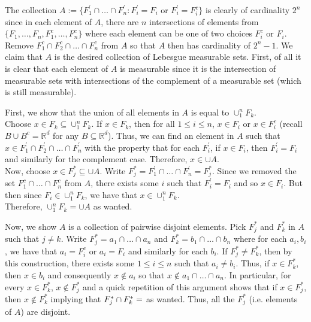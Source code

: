 \documentclass[12pt]{article}
\newcommand{\R}{\mathbb{R}}
\newenvironment{solution}[2][Solution]{\begin{trivlist}
\item[\hskip \labelsep {\bfseries #1}]}{\end{trivlist}}
\begin{document}
\begin{solution}{}

    The collection $A:= \{F_1^{'} \cap \hdots \cap F_n^{'}: F_i^{'} = F_i$ or $F_i^{'} = F_i^c\}$ is clearly of
    cardinality $2^n$ since in each element of $A$, there are $n$ intersections of elements from 
    $\{F_1,\hdots,F_n,F_1^c,\hdots,F_n^c\}$ where each element 
    can be one of two choices $F_i^c$ or $F_i$. Remove $F_1^c \cap F_2^c \cap \hdots \cap F_n^c$ from $A$ so 
    that $A$ then has cardinality of $2^n-1$. We claim that $A$ is the desired collection of Lebesgue measurable 
    sets. First, of all it is clear that each element of $A$ is measurable since it is the intersection of
    measurable sets with intersections of the complement of a measurable set (which is still measurable).
    \newline
    
    First, we show that the union of all elements in $A$ is equal to $\cup_1^n F_k$.\\
    Choose $x\in F_k\subseteq \cup_1^n F_k.$ If $x\in F_k$, then for all $1\leq i\leq n$, $x\in F_i$ or $x\in F_i^c$
    (recall $B \cup B^c = \R^d$ for any $B\subseteq\R^d$). Thus, we can find an element in $A$ such that
    $x\in F_1^{'} \cap F_2^{'} \cap \hdots \cap F_n^{'}$ with the property that for each $F_i^{'}$, if $x\in F_i$,
    then $F_i^{'}=F_i$ and similarly for the complement case. Therefore, $x\in\cup A$.\\
    Now, choose $x\in F_j^{*}\subseteq \cup A$. Write $F_j^{*} = F_1^{'}\cap\hdots\cap F_n^{'} = F_j^{*}$. 
    Since we removed the set $F_1^c \cap \hdots \cap F_n^c$ from $A$, there exists some $i$ such that
    $F_i^{'} = F_i$ and so $x\in F_i$. But then since $F_i\in\cup_1^n F_k$, we have that $x\in\cup_1^n F_k$.\\
    Therefore, $\cup_1^n F_k = \cup A$ as wanted.
    \newline
    
    Now, we show $A$ is a collection of pairwise disjoint elements. Pick $F_j^{*}$ and $F_k^{*}$ in $A$ such that $j\neq k$.
    Write $F_j^{*} = a_1 \cap \hdots \cap a_n$ and $F_k^{*} = b_1 \cap \hdots \cap b_n$ where for each $a_i, b_i$, we have that
    $a_i = F_i^c$ or $a_i = F_i$ and similarly for each $b_i$. If $F_j^{*}\neq F_k^{*}$, then by this construction, there
    exists some $1\leq i\leq n$ such that $a_i\neq b_i$. Thus, if $x\in F_k^{*}$, then $x\in b_i$ and consequently $x\not\in a_i$
    so that $x\not\in a_1\cap \hdots\cap a_n$. In particular, for every $x\in F_k^{*}$, $x\not\in F_j^{*}$ and a quick repetition
    of this argument shows that if $x\in F_j^{*}$, then $x\not\in F_k^{*}$ implying that $F_j^{*}\cap F_k^{*}=\empty$ as wanted.
    Thus, all the $F_j^{*}$ (i.e. elements of $A$) are disjoint.\\
    

\end{solution}
\end{document}
